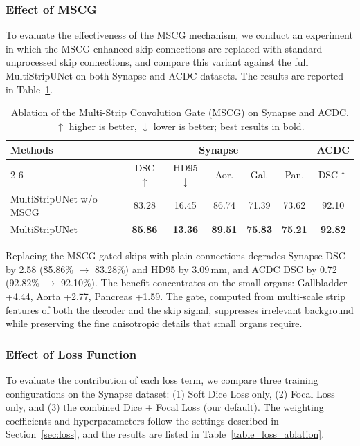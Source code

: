 \documentclass{llncs}
\begin{document}
\subsubsection{Effect of MSCG}


To evaluate the effectiveness of the MSCG mechanism, we conduct an experiment in which the MSCG-enhanced skip connections are replaced with standard unprocessed skip connections, and compare this variant against the full MultiStripUNet on both Synapse and ACDC datasets. The results are reported in Table~\ref{table4}.

\begin{table}[!htbp]
\centering
\footnotesize
\caption{Ablation of the Multi-Strip Convolution Gate (MSCG) on Synapse and ACDC. $\uparrow$ higher is better, $\downarrow$ lower is better; best results in bold.}
\label{table4}
\begin{tabular}{l|cc|ccc|c}
\hline
\multirow{2}{*}{Methods} & \multicolumn{5}{c}{Synapse} & ACDC \\
\cline{2-6}
 & DSC$\uparrow$ & HD95$\downarrow$ & Aor. & Gal. & Pan. & DSC$\uparrow$ \\
\hline
MultiStripUNet w/o MSCG & 83.28 & 16.45 & 86.74 & 71.39 & 73.62 & 92.10 \\
MultiStripUNet          & \textbf{85.86} & \textbf{13.36} & \textbf{89.51} & \textbf{75.83} & \textbf{75.21} & \textbf{92.82} \\
\hline
\end{tabular}
\end{table} Replacing the MSCG-gated skips with plain connections degrades Synapse DSC by 2.58 (85.86\% $\rightarrow$ 83.28\%) and HD95 by 3.09\,mm, and ACDC DSC by 0.72 (92.82\% $\rightarrow$ 92.10\%). The benefit concentrates on the small organs: Gallbladder +4.44, Aorta +2.77, Pancreas +1.59. The gate, computed from multi-scale strip features of both the decoder and the skip signal, suppresses irrelevant background while preserving the fine anisotropic details that small organs require.

\subsubsection{Effect of Loss Function}

To evaluate the contribution of each loss term, we compare three training configurations on the Synapse dataset: (1) Soft Dice Loss only, (2) Focal Loss only, and (3) the combined Dice + Focal Loss (our default). The weighting coefficients and hyperparameters follow the settings described in Section~\ref{sec:loss}, and the results are listed in Table~\ref{table_loss_ablation}.
\end{document}
